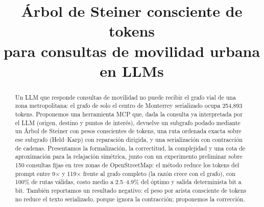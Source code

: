 \documentclass[conference,10pt]{IEEEtran}
\begin{document}
\title{Árbol de Steiner consciente de tokens\\para consultas de movilidad urbana en LLMs}

\author{
}

\maketitle

\begin{abstract}
Un LLM que responde consultas de movilidad no puede recibir el grafo vial de una zona metropolitana: el grafo de solo el centro de Monterrey serializado ocupa 254{,}893 tokens. Proponemos una herramienta MCP que, dada la consulta ya interpretada por el LLM (origen, destino y puntos de interés), devuelve un subgrafo podado mediante un Árbol de Steiner con pesos conscientes de tokens, una ruta ordenada exacta sobre ese subgrafo (Held--Karp) con reparación dirigida, y una serialización con contracción de cadenas. Presentamos la formalización, la correctitud, la complejidad y una cota de aproximación para la relajación simétrica, junto con un experimento preliminar sobre 150 consultas fijas en tres zonas de OpenStreetMap: el método reduce los tokens del prompt entre 9$\times$ y 119$\times$ frente al grafo completo (la razón crece con el grafo), con 100\% de rutas válidas, costo medio a 2.5--4.9\% del óptimo y salida determinista bit a bit. También reportamos un resultado negativo: el peso por arista consciente de tokens no reduce el texto serializado, porque ignora la contracción; proponemos la corrección.
\end{abstract}
\end{document}
